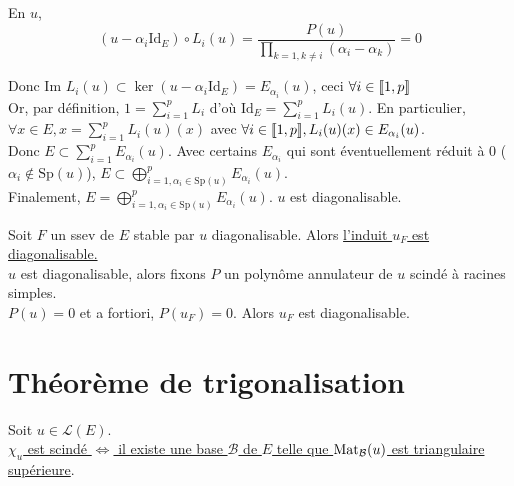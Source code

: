 \documentclass[]{article}
\begin{document}
\begin{itemize}
    En $u$,
    \[(u - \alpha_i \text{Id}_E) \circ L_i (u) = \frac{P(u)}{\prod_{k=1, k \neq i}(\alpha_i - \alpha_k)} = 0\]

    Donc $\text{Im } L_i(u) \subset \ker (u-\alpha_i \text{Id}_E) = E_{\alpha_i}(u)$, ceci $\forall i \in \llbracket {1}, {p} \rrbracket$ \\

    Or, par définition, $1 = \sum_{i=1}^{p} L_i$ d'où $\text{Id}_E = \sum_{i=1}^{p} L_i(u)$. En particulier, $\forall x \in E, x = \sum_{i=1}^{p} L_i(u)(x)$ avec $\forall i \in \llbracket {1}, {p} \rrbracket, L_i(u)(x) \in E_{\alpha_i}(u)$. \\

    Donc $E \subset \sum_{i=1}^p E_{\alpha_i}(u)$. Avec certains $E_{\alpha_i}$ qui sont éventuellement réduit à 0 ($\alpha_i \not \in \text{Sp}(u)$), $E \subset \bigoplus_{i=1, \alpha_i \in \text{Sp}(u)}^p E_{\alpha_i}(u)$. \\
    
    Finalement, $E = \bigoplus_{i=1, \alpha_i \in \text{Sp}(u)}^p E_{\alpha_i}(u)$. $u$ est diagonalisable. 
\end{itemize}

Soit $F$ un ssev de $E$ stable par $u$ diagonalisable. Alors \underline{l'induit $u_F$ est diagonalisable.} \\

$u$ est diagonalisable, alors fixons $P$ un polynôme annulateur de $u$ scindé à racines simples. \\

$P(u) = 0$ et a fortiori, $P(u_F) = 0$. Alors $u_F$ est diagonalisable.  

\section{Théorème de trigonalisation}

Soit $u \in \mathcal{L}(E)$. \\

\underline{$\chi_u$ est scindé $\iff$ il existe une base $\mathcal{B}$ de $E$ telle que $\text{Mat}_{\mathcal{B}}(u)$ est triangulaire supérieure}. 
\end{document}
